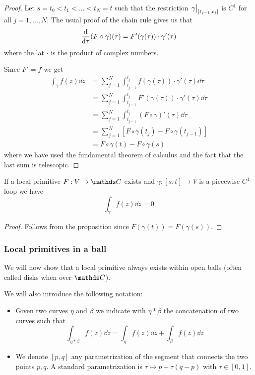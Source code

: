\documentclass[12pt]{extarticle}
\begin{document}
\begin{proof}
	Let $s = t_0 < t_1 < \dots < t_N = t$ such that the restriction $\eval{\gamma}_{[t_{j-1}, t_j]}$
	is $C^1$ for all $j = 1, \dots, N$.
	The usual proof of the chain rule gives us that
	\begin{equation}
		\dv{\tau} (F\circ \gamma)(\tau) = F'(\gamma(\tau)) \cdot \gamma'(\tau)
	\end{equation}
	where the lat $\cdot$ is the product of complex numbers.

	Since $F' = f$ we get
	\begin{align}
		\int_\gamma f(z) \dd z
		 & = \sum^N_{j = 1} \int^{t_j}_{t_{j-1}} f(\gamma(\tau)) \cdot \gamma'(\tau) \dd \tau  \\
		 & = \sum^N_{j = 1} \int^{t_j}_{t_{j-1}} F'(\gamma(\tau)) \cdot \gamma'(\tau) \dd \tau \\
		 & = \sum^N_{j = 1} \int^{t_j}_{t_{j-1}} (F\circ \gamma)'(\tau) \dd \tau               \\
		 & = \sum^N_{j = 1} [F \circ \gamma(t_j) - F \circ \gamma(t_{j-1})]                    \\
		 & = F \circ \gamma(t) - F \circ \gamma(s)
	\end{align}
	where we have used the fundamental theorem of calculus and
	the fact that the last sum is telescopic.
\end{proof}

\begin{corollary}{}{}
	If a local primitive $F: V \to \C$ exists and $\gamma: [s, t] \to V$ is a piecewise $C^1$ loop
	we have
	\begin{equation}
		\int_\gamma f(z) \dd z = 0
	\end{equation}
\end{corollary}
\begin{proof}
	Follows from the proposition since $F(\gamma(t)) = F(\gamma(s))$.
\end{proof}

\subsubsection{Local primitives in a ball}

We will now show that a local primitive always exists within open balls
(often called disks when over $\C$).

We will also introduce the following notation:
\begin{itemize}
	\item Given two curves $\eta$ and $\beta$ we indicate with $\eta * \beta$ the concatenation
	      of two curves such that
	      \begin{equation}
		      \int_{\eta * \beta} f(z) \dd z = \int_\eta f(z) \dd z + \int_\beta f(z) \dd z
	      \end{equation}
	\item We denote $[p, q]$ any parametrization of the segment that connects the two points $p, q$.
	      A standard parametrization is $\tau \mapsto p + \tau(q-p)$ with $\tau \in [0, 1]$.
\end{itemize}
\end{document}

